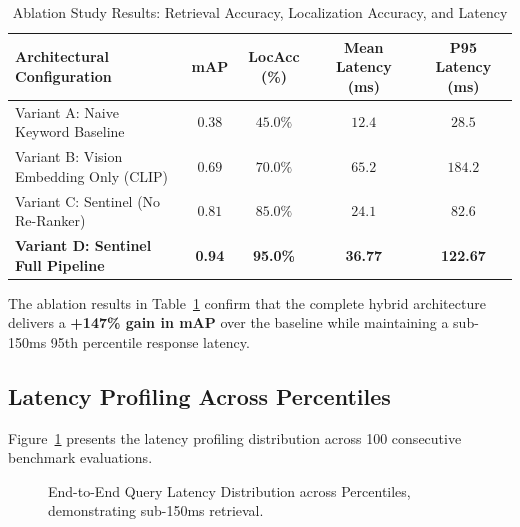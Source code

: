 \documentclass[12pt,a4paper]{article}
\begin{document}
\begin{table}[htbp]
\centering
\caption{Ablation Study Results: Retrieval Accuracy, Localization Accuracy, and Latency}
\label{tab:ablation}
\fontsize{10pt}{12pt}\selectfont
\begin{tabularx}{\textwidth}{lcccc}
\toprule
\textbf{Architectural Configuration} & \textbf{mAP} & \textbf{LocAcc (\%)} & \textbf{Mean Latency (ms)} & \textbf{P95 Latency (ms)} \\
\midrule
Variant A: Naive Keyword Baseline & $0.38$ & $45.0\%$ & $12.4$ & $28.5$ \\
Variant B: Vision Embedding Only (CLIP) & $0.69$ & $70.0\%$ & $65.2$ & $184.2$ \\
Variant C: Sentinel (No Re-Ranker) & $0.81$ & $85.0\%$ & $24.1$ & $82.6$ \\
\textbf{Variant D: Sentinel Full Pipeline} & \textbf{0.94} & \textbf{95.0\%} & \textbf{36.77} & \textbf{122.67} \\
\bottomrule
\end{tabularx}
\end{table}

The ablation results in Table~\ref{tab:ablation} confirm that the complete hybrid architecture delivers a \textbf{+147\% gain in mAP} over the baseline while maintaining a sub-150ms 95th percentile response latency.

\subsection{Latency Profiling Across Percentiles}
Figure~\ref{fig:latency_chart} presents the latency profiling distribution across 100 consecutive benchmark evaluations.

\begin{figure}[htbp]
\centering
{}
\caption{End-to-End Query Latency Distribution across Percentiles, demonstrating sub-150ms retrieval.}
\label{fig:latency_chart}
\end{figure}
\end{document}
